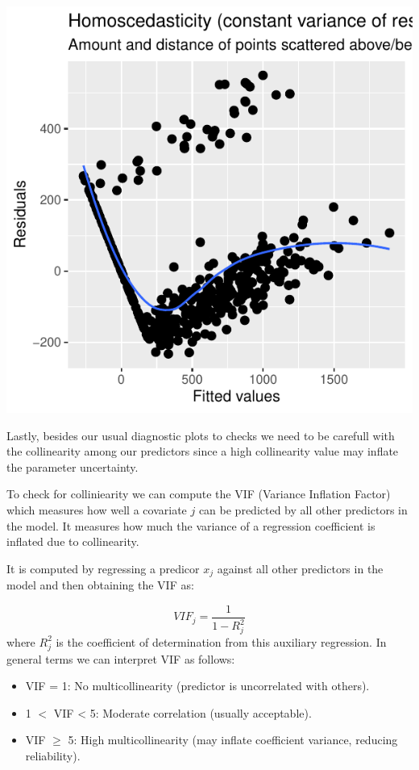 \documentclass[
  letterpaper,
  DIV=11,
  numbers=noendperiod]{scrartcl}
\begin{document}
\begin{tcolorbox}
\begin{center}
\includegraphics{index_files/figure-pdf/unnamed-chunk-34-3.pdf}
\end{center}

\end{tcolorbox}

Lastly, besides our usual diagnostic plots to checks we need to be
carefull with the collinearity among our predictors since a high
collinearity value may inflate the parameter uncertainty.

To check for colliniearity we can compute the VIF (Variance Inflation
Factor) which measures how well a covariate \(j\) can be predicted by
all other predictors in the model. It measures how much the variance of
a regression coefficient is inflated due to collinearity.

It is computed by regressing a predicor \(x_j\) against all other
predictors in the model and then obtaining the VIF as:

\[
VIF_j = \frac{1}{1-R^2_j}
\] where \(R^2_j\) is the coefficient of determination from this
auxiliary regression. In general terms we can interpret VIF as follows:

\begin{itemize}
\item
  VIF = 1: No multicollinearity (predictor is uncorrelated with others).
\item
  1 \(<\) VIF \textless{} 5: Moderate correlation (usually acceptable).
\item
  VIF \(\geq\) 5: High multicollinearity (may inflate coefficient
  variance, reducing reliability).
\end{itemize}
\end{document}
